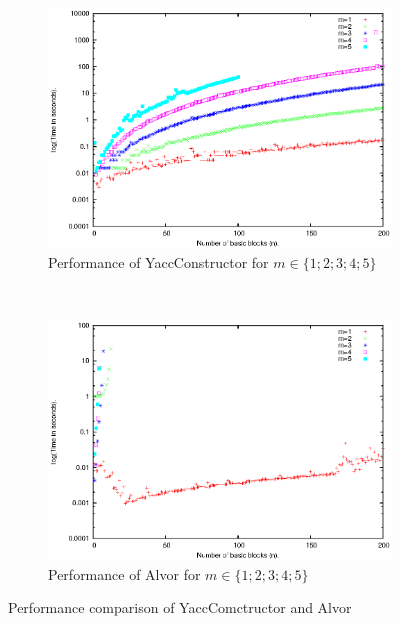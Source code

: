 \documentclass{sigplanconf}
\begin{document}
\begin{figure}
	\begin{center}
      \begin{subfigure}[b]{0.45\textwidth}
        \includegraphics[scale=0.65]{Graphics/yc.eps}
        \caption{Performance of YaccConstructor for $m \in \{1; 2;3;4;5\}$}
       \label{perfYC}
      \end{subfigure}
      ~
      \begin{subfigure}[b]{0.45\textwidth}
        \includegraphics[scale=0.65]{Graphics/alvor.eps}
        \caption{Performance of Alvor for $m \in \{1; 2;3;4;5\}$}
       \label{perfAlvor}
      \end{subfigure}
    
    \end{center}
    \caption{Performance comparison of YaccComctructor and Alvor}
    \label{performance}
\end{figure}
\end{document}
